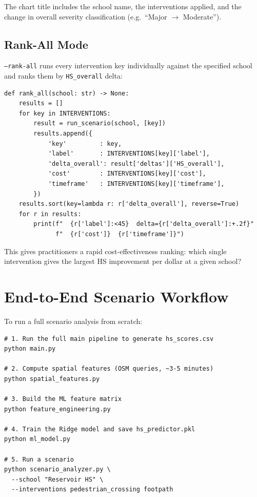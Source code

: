 \documentclass[11pt,a4paper,openany]{book}
\begin{document}
The chart title includes the school name, the interventions applied, and the change in overall severity classification (e.g.\ ``Major $\to$ Moderate'').

\subsection{Rank-All Mode}

\texttt{--rank-all} runs every intervention key individually against the specified school and ranks them by \texttt{HS\_overall} delta:

\begin{lstlisting}[style=python, caption={rank\_all() in scenario\_analyzer.py.}]
def rank_all(school: str) -> None:
    results = []
    for key in INTERVENTIONS:
        result = run_scenario(school, [key])
        results.append({
            'key'         : key,
            'label'       : INTERVENTIONS[key]['label'],
            'delta_overall': result['deltas']['HS_overall'],
            'cost'        : INTERVENTIONS[key]['cost'],
            'timeframe'   : INTERVENTIONS[key]['timeframe'],
        })
    results.sort(key=lambda r: r['delta_overall'], reverse=True)
    for r in results:
        print(f"  {r['label']:<45}  delta={r['delta_overall']:+.2f}"
              f"  {r['cost']}  {r['timeframe']}")
\end{lstlisting}

This gives practitioners a rapid cost-effectiveness ranking: which single intervention gives the largest HS improvement per dollar at a given school?

\section{End-to-End Scenario Workflow}

To run a full scenario analysis from scratch:

\begin{lstlisting}[style=bash, caption={Complete pipeline to enable scenario analysis.}]
# 1. Run the full main pipeline to generate hs_scores.csv
python main.py

# 2. Compute spatial features (OSM queries, ~3-5 minutes)
python spatial_features.py

# 3. Build the ML feature matrix
python feature_engineering.py

# 4. Train the Ridge model and save hs_predictor.pkl
python ml_model.py

# 5. Run a scenario
python scenario_analyzer.py \
  --school "Reservoir HS" \
  --interventions pedestrian_crossing footpath
\end{lstlisting}
\end{document}
